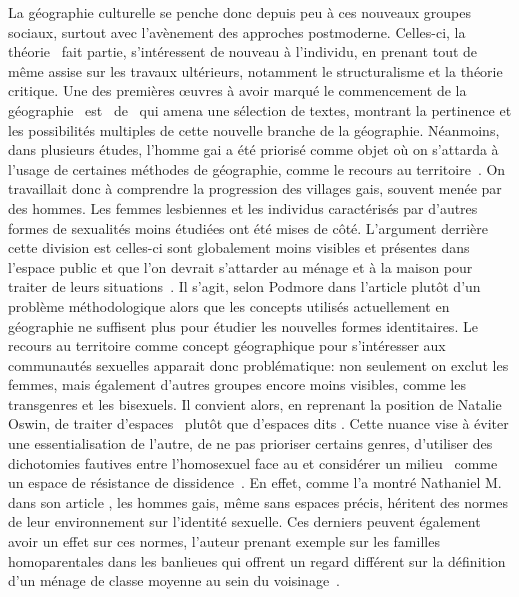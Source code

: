 La géographie culturelle se penche donc depuis peu à ces nouveaux groupes sociaux, surtout avec l'avènement des approches postmoderne.  
Celles-ci, la théorie \qu\ fait partie, s'intéressent de nouveau à l'individu, en prenant tout de même assise sur les travaux ultérieurs, notamment le structuralisme et la théorie critique. 
Une des premières œuvres à avoir marqué le commencement de la géographie \qu\ est~ de~\citet{Bell1994} qui amena une sélection de textes, montrant la pertinence et les possibilités multiples de cette nouvelle branche de la géographie. 
Néanmoins, dans plusieurs études, l'homme gai a été priorisé comme objet où on s'attarda à l'usage de certaines méthodes de géographie, comme le recours au territoire~\citep{Podmore2001,Oswin2008}. 
On travaillait donc à comprendre la progression des villages gais, souvent menée par des hommes.
Les femmes lesbiennes et les individus caractérisés par d'autres formes de sexualités moins étudiées ont été mises de côté.
L'argument derrière cette division est celles-ci sont globalement moins visibles et présentes dans l'espace public et que l'on devrait s'attarder au ménage et à la maison pour traiter de leurs situations~\citep[333-334]{Podmore2001}. 
Il s'agit, selon Podmore dans l'article  plutôt d'un problème méthodologique alors que les concepts utilisés actuellement en géographie ne suffisent plus pour étudier les nouvelles formes identitaires. 
Le recours au territoire comme concept géographique pour s'intéresser aux communautés sexuelles apparait donc problématique: non seulement on exclut les femmes, mais également d'autres groupes encore moins visibles, comme les transgenres et les bisexuels. 
Il convient alors, en reprenant la position de Natalie Oswin, de traiter d'espaces \qus\ plutôt que d'espaces dits \lgbt.
Cette nuance vise à éviter une essentialisation de l'autre, de ne pas prioriser certains genres, d'utiliser des dichotomies fautives entre l'homosexuel face au  et considérer  un milieu \qu\ comme un espace de résistance de dissidence~\citep{Oswin2008}. 
En effet, comme l'a montré Nathaniel M. \citet{Lewis2011} dans son article , les hommes gais, même sans espaces précis, héritent des normes de leur environnement sur l'identité sexuelle. 
Ces derniers peuvent également avoir un effet sur ces normes, l'auteur prenant exemple sur les familles homoparentales dans les banlieues qui offrent un regard différent sur la définition d'un ménage de classe moyenne au sein du voisinage~\citep[304]{Lewis2011}.

